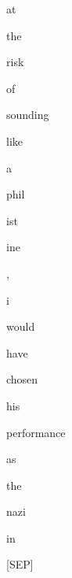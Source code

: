\documentclass[varwidth=150mm]{standalone}
\begin{document}
\begin{CJK*}{UTF8}{gbsn}
{{{\colorbox{red!0.0}{\strut at} \colorbox{red!0.0}{\strut the} \colorbox{red!0.0}{\strut risk} \colorbox{red!0.0}{\strut of} \colorbox{red!0.0}{\strut sounding} \colorbox{red!0.0}{\strut like} \colorbox{red!2.296492338180542}{\strut a} \colorbox{red!0.0}{\strut phil}\colorbox{red!0.0}{\strut ist}\colorbox{red!2.4436023235321045}{\strut ine} \colorbox{red!0.0}{\strut ,} \colorbox{red!5.376103401184082}{\strut i} \colorbox{red!2.3035802841186523}{\strut would} \colorbox{red!1.4741134643554688}{\strut have} \colorbox{red!3.612119436264038}{\strut chosen} \colorbox{red!2.7244415283203125}{\strut his} \colorbox{red!91.56890106201172}{\strut performance} \colorbox{red!24.233827590942383}{\strut as} \colorbox{red!4.207350730895996}{\strut the} \colorbox{red!6.056692123413086}{\strut nazi} \colorbox{red!14.664270401000977}{\strut in} \colorbox{red!7.09998083114624}{\strut [SEP]}
}}}
\end{CJK*}
\end{document}
